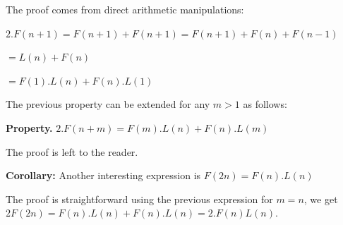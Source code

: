 \medskip
The proof comes from direct arithmetic manipulations:

$2.F(n+1) = F(n+1) +  F(n+1) =  F(n+1) + F(n) + F(n-1)$

$= L(n) + F(n) $

$= F(1).L(n) + F(n).L(1)$
\medskip


The previous property can be extended for any $m>1$ as follows:

\noindent \textbf{Property. } 
\label{prop:Lucas3}
$2.F(n+m) = F(m).L(n) + F(n).L(m)$

The proof is left to the reader.

\bigskip

\noindent \textbf{Corollary:} Another interesting expression is
$F(2n) = F(n).L(n)$

The proof is straightforward using the previous expression for $m=n$, we get $2F(2n) = F(n).L(n) + F(n).L(n) = 2.F(n)L(n)$.

